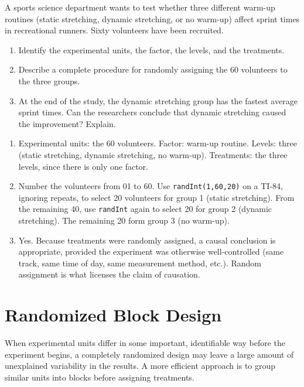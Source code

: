 \begin{Exercise}[title={Designing a Completely Randomized Experiment}, label={ex:crd}]
A sports science department wants to test whether three different warm-up routines (static stretching, dynamic stretching, or no warm-up) affect sprint times in recreational runners. Sixty volunteers have been recruited.

\begin{enumerate} 
    \item Identify the experimental units, the factor, the levels, and the treatments.
    \item Describe a complete procedure for randomly assigning the 60 volunteers to the three groups.
    \item At the end of the study, the dynamic stretching group has the fastest average sprint times. Can the researchers conclude that dynamic stretching caused the improvement? Explain.
\end{enumerate}
\end{Exercise}
\begin{Answer}[ref={ex:crd}]
\begin{enumerate} 
    \item Experimental units: the 60 volunteers. Factor: warm-up routine. Levels: three (static stretching, dynamic stretching, no warm-up). Treatments: the three levels, since there is only one factor.
    \item Number the volunteers from 01 to 60. Use \texttt{randInt(1,60,20)} on a TI-84, ignoring repeats, to select 20 volunteers for group 1 (static stretching). From the remaining 40, use \texttt{randInt} again to select 20 for group 2 (dynamic stretching). The remaining 20 form group 3 (no warm-up).
    \item Yes. Because treatments were randomly assigned, a causal conclusion is appropriate, provided the experiment was otherwise well-controlled (same track, same time of day, same measurement method, etc.). Random assignment is what licenses the claim of causation.
\end{enumerate}
\end{Answer}

\section{Randomized Block Design}

When experimental units differ in some important, identifiable way before the experiment begins, a completely randomized design may leave a large amount of unexplained variability in the results. A more efficient approach is to group similar units into blocks before assigning treatments.

